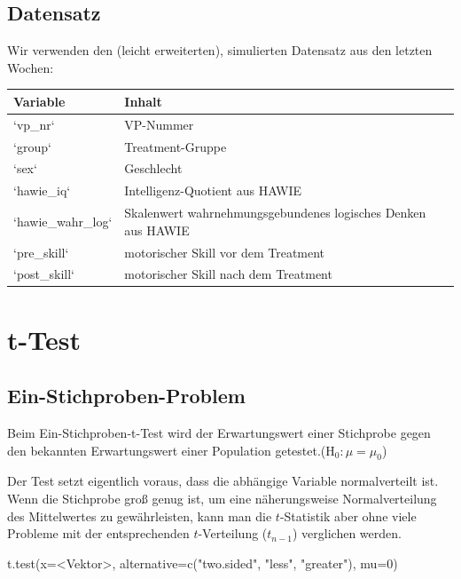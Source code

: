 \documentclass[
]{book}
\newenvironment{Shaded}{\begin{snugshade}}{\end{snugshade}}
\newcommand{\AttributeTok}[1]{\textcolor[rgb]{0.77,0.63,0.00}{#1}}
\newcommand{\DecValTok}[1]{\textcolor[rgb]{0.00,0.00,0.81}{#1}}
\newcommand{\FunctionTok}[1]{\textcolor[rgb]{0.00,0.00,0.00}{#1}}
\newcommand{\NormalTok}[1]{#1}
\newcommand{\SpecialCharTok}[1]{\textcolor[rgb]{0.00,0.00,0.00}{#1}}
\newcommand{\StringTok}[1]{\textcolor[rgb]{0.31,0.60,0.02}{#1}}
\begin{document}
\hypertarget{datensatz-2}{%
\subsection{Datensatz}\label{datensatz-2}}

Wir verwenden den (leicht erweiterten), simulierten Datensatz aus den letzten Wochen:

\begin{tabular}[t]{ll}
\toprule
Variable & Inhalt\\
\midrule
`vp\_nr` & VP-Nummer\\
`group` & Treatment-Gruppe\\
`sex` & Geschlecht\\
`hawie\_iq` & Intelligenz-Quotient aus HAWIE\\
`hawie\_wahr\_log` & Skalenwert wahrnehmungsgebundenes 
 logisches Denken aus HAWIE\\
\addlinespace
`pre\_skill` & motorischer Skill vor dem Treatment\\
`post\_skill` & motorischer Skill nach dem Treatment\\
\bottomrule
\end{tabular}

\hypertarget{t-test}{%
\section{t-Test}\label{t-test}}

\hypertarget{ein-stichproben-problem}{%
\subsection{Ein-Stichproben-Problem}\label{ein-stichproben-problem}}

Beim Ein-Stichproben-t-Test wird der Erwartungswert einer Stichprobe gegen den bekannten Erwartungswert einer Population getestet.(\(\text{H}_0: \mu = \mu_0\))

Der Test setzt eigentlich voraus, dass die abhängige Variable normalverteilt ist. Wenn die Stichprobe groß genug ist, um eine näherungsweise Normalverteilung des Mittelwertes zu gewährleisten, kann man die \(t\)-Statistik aber ohne viele Probleme mit der entsprechenden \(t\)-Verteilung (\(t_{n-1}\)) verglichen werden.

\begin{Shaded}
\begin{Highlighting}[]
\FunctionTok{t.test}\NormalTok{(}\AttributeTok{x=}\SpecialCharTok{\textless{}}\NormalTok{Vektor}\SpecialCharTok{\textgreater{}}\NormalTok{, }\AttributeTok{alternative=}\FunctionTok{c}\NormalTok{(}\StringTok{"two.sided"}\NormalTok{, }\StringTok{"less"}\NormalTok{, }\StringTok{"greater"}\NormalTok{), }\AttributeTok{mu=}\DecValTok{0}\NormalTok{)}
\end{Highlighting}
\end{Shaded}
\end{document}
